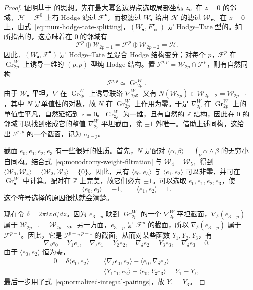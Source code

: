 \begin{proof}
证明基于  的思想。先在最大幂幺边界点选取局部坐标 $z$。在 $z=0$ 的邻域，$\mathcal H=\mathcal F^0$ 上有 Hodge 滤过 $\mathcal F^\bullet$，而权滤过 $W_\bullet$ 给出 $\mathcal H$ 的滤过 $\mathcal W_\bullet$。在 $z=0$ 上，由式~\eqref{eq:mum-hodge-tate-splitting}，$(W_\bullet,F_{\mathrm{lim}}^\bullet)$ 是 Hodge--Tate 型的。如  所指出的，这意味着在 $0$ 的邻域有
\[
\mathcal F^p\oplus\mathcal W_{2p-1}
=\mathcal F^p\oplus\mathcal W_{2p-2}=\mathcal H.
\]
因此，$(W_\bullet,\mathcal F^\bullet)$ 是 Hodge--Tate 型混合 Hodge 结构变分；对每个 $p$，$\mathcal F^p$ 在 $\operatorname{Gr}_{2p}^W$ 上诱导一维的 $(p,p)$ 型纯 Hodge 结构。置
$\mathcal I^{p,p}=\mathcal W_{2p}\cap\mathcal F^p$，则有自然同构
\[
\mathcal I^{p,p}\simeq\operatorname{Gr}_{2p}^W.
\]
由于 $\mathcal W_\bullet$ 平坦，$\nabla$ 在 $\operatorname{Gr}_{2p}^W$ 上诱导联络 $\nabla_{2p}^W$。又有
$N(\mathcal W_{2p})\subset\mathcal W_{2p-2}=\mathcal W_{2p-1}$，其中 $N$ 是单值性的对数，故 $N$ 在 $\operatorname{Gr}_{2p}^W$ 上作用为零。于是 $\nabla_{2p}^W$ 在 $\operatorname{Gr}_{2p}^W$ 上的单值性平凡，自然延拓到 $z=0$。$\operatorname{Gr}_{2p}^W$ 为一维，且有自然的 $\mathbb Z$ 结构，因此在 $0$ 的邻域可以找到张成它的整值 $\nabla_{2p}^W$ 平坦截面，除 $\pm1$ 外唯一。借助上述同构，这给出 $\mathcal I^{p,p}$ 的一个截面，记为 $e_{3-p}$。

截面 $e_0,e_1,e_2,e_3$ 有一些很好的性质。首先，$N$ 是配对
$\langle\alpha,\beta\rangle=\int_V\alpha\wedge\beta$ 的无穷小自同构。结合式~\eqref{eq:monodromy-weight-filtration} 与 $\mathcal W_4=\mathcal W_5$，得到
$\langle\mathcal W_0,\mathcal W_4\rangle=\langle\mathcal W_2,\mathcal W_2\rangle=\{0\}$。因此，只有
$\langle e_0,e_3\rangle$ 与 $\langle e_1,e_2\rangle$ 可以非零，并可在 $\operatorname{Gr}_\bullet^W$ 中计算。配对在 $\mathbb Z$ 上完美，故它们必为 $\pm1$。可以选取 $e_0,e_1,e_2,e_3$，使
\begin{equation}\label{eq:normalized-integral-pairings}
\langle e_0,e_3\rangle=-1,\qquad\langle e_1,e_2\rangle=1.
\end{equation}
这个符号选择的原因很快就会清楚。

现在令 $\delta=2\pi iz\,d/dz$。因为 $e_{3-p}$ 映到 $\operatorname{Gr}_{2p}^W$ 的一个 $\nabla_{2p}^W$ 平坦截面，$\nabla_\delta(e_{3-p})$ 属于 $\mathcal W_{2p-1}=\mathcal W_{2p-2}$。另一方面，$e_{3-p}$ 是 $\mathcal F^p$ 的截面，所以 $\nabla_\delta(e_{3-p})$ 属于 $\mathcal F^{p-1}$。因此，它是 $\mathcal I^{p-1,p-1}$ 的截面，从而对某些函数 $Y_1,Y_2,Y_3$，有
\[
\nabla_\delta e_0=Y_1e_1,\quad
\nabla_\delta e_1=Y_2e_2,\quad
\nabla_\delta e_2=Y_3e_3,\quad
\nabla_\delta e_3=0.
\]
由于 $\langle e_0,e_2\rangle$ 恒为零，
\[
\begin{aligned}
0=\delta\langle e_0,e_2\rangle
&=\langle\nabla_\delta e_0,e_2\rangle+\langle e_0,\nabla_\delta e_2\rangle\\
&=\langle Y_1e_1,e_2\rangle+\langle e_0,Y_3e_3\rangle=Y_1-Y_3,
\end{aligned}
\]
最后一步用了式~\eqref{eq:normalized-integral-pairings}，故 $Y_1=Y_3$。


\end{proof}
